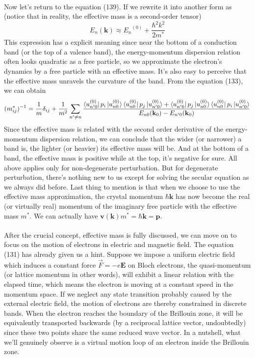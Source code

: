 \documentclass{article}
\begin{document}
\\
Now let's return to the equation (139). If we rewrite it into another form as (notice that in reality, the effective mass is a second-order tensor)\begin{equation}
    E_n(\mathbf{k})\approx{E_n}^{(0)}+\frac{\hbar^2k^2}{2m^*}
\end{equation}This expression has a explicit meaning since near the bottom of a conduction band (or the top of a valence band), the energy-momentum dispersion relation often looks quadratic as a free particle, so we approximate the electron's dynamics by a free particle with an effective mass. It's also easy to perceive that the effective mass unravels the curvature of the band. From the equation (133), we can obtain\begin{equation}
    (m^*_{ij})^{-1}=\frac{1}{m}\delta_{ij}+\frac{1}{m^2}\sum_{n'\neq{n}}\frac{\bra{u_{n'0}^{(0)}}p_i\ket{u_{n0}^{(0)}}\bra{u_{n0}^{(0)}}p_j\ket{u_{n'0}^{(0)}}+\bra{u_{n'0}^{(0)}}p_j\ket{u_{n0}^{(0)}}\bra{u_{n0}^{(0)}}p_i\ket{u_{n'0}^{(0)}}}{E_{n0}(\mathbf{k}_0)-E_{n'0}(\mathbf{k}_0)}
\end{equation}Since the effective mass is related with the second order derivative of the energy-momentum dispersion relation, we can conclude that the wider (or narrower) a band is, the lighter (or heavier) its effective mass will be. And at the bottom of a band, the effective mass is positive while at the top, it's negative for sure. All above applies only for non-degenerate perturbation. But for degenerate perturbation, there's nothing new to us except for solving the secular equation as we always did before. Last thing to mention is that when we choose to use the effective mass approximation, the crystal momentum $\hbar\mathbf{k}$ has now become the real (or virtually real) momentum of the imaginary free particle with the effective mass $m^*$. We can actually have $\mathbf{v}(\mathbf{k})m^*=\hbar\mathbf{k}=\mathbf{p}$.\\
\\
After the crucial concept, effective mass is fully discussed, we can move on to focus on the motion of electrons in electric and magnetic field. The equation (131) has already given us a hint. Suppose we impose a uniform electric field which induces a constant force $\vec{F}=-e\mathbf{E}$ on Bloch electrons, the quasi-momentum (or lattice momentum in other words), will exhibit a linear relation with the elapsed time, which means the electron is moving at a constant speed in the momentum space. If we neglect any state transition probably caused by the external electric field, the motion of electrons are thereby constrained in discrete bands. When the electron reaches the boundary of the Brillouin zone, it will be equivalently transported backwards (by a reciprocal lattice vector, undoubtedly) since these two points share the same reduced wave vector. In a nutshell, what we'll genuinely observe is a virtual motion loop of an electron inside the Brillouin zone.\\
\end{document}
